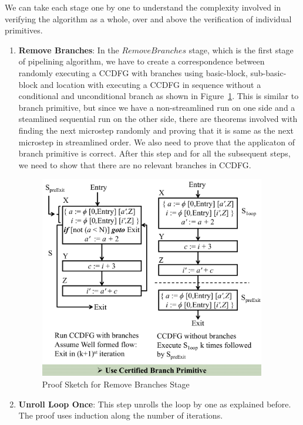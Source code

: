 We can take each stage one by one to understand the complexity involved in 
verifying the algorithm as a whole, over and above the verification of 
individual primitives.

\begin{enumerate}
\item \textbf{Remove Branches}: In the $Remove Branches$ stage, which is the first stage of pipelining algorithm, we have to create a correspondence between randomly executing a CCDFG with branches using basic-block, sub-basic-block and location with executing a CCDFG in sequence without a conditional and unconditional branch as shown in Figure~\ref{fig:proof-remove-branches}. This is similar to branch primitive, but since we have a non-streamlined run on one side and a steamlined sequential run on the other side, there are theorems involved with finding the next microstep randomly and proving that it is same as the next microstep in streamlined order. We also need to prove that the applicaton of branch primitive is correct. After this step and for all the subsequent steps, we need to show that there are no relevant branches in CCDFG.
                                             
\begin{figure}[t!]
\begin{center}
\includegraphics[height=3.5in]{fig-proposal/proof-remove-branches}
\end{center}
\caption{Proof Sketch for Remove Branches Stage}
\label{fig:proof-remove-branches}
\end{figure}

\item \textbf{Unroll Loop Once}: This step unrolls the loop by one as explained before. The proof uses induction along the number of iterations.


\end{enumerate}
